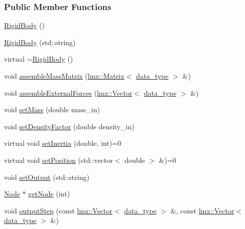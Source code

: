 \subsubsection*{Public Member Functions}
\begin{DoxyCompactItemize}
\item 
\hyperlink{classmknix_1_1_rigid_body_a4e30b93577cba2bdf87201621a5b637c}{Rigid\+Body} ()
\item 
\hyperlink{classmknix_1_1_rigid_body_a2b343858ebee91bb44df59d7a19a5f10}{Rigid\+Body} (std\+::string)
\item 
virtual \hyperlink{classmknix_1_1_rigid_body_a61c219dee02f49659bc34528c2d0af49}{$\sim$\+Rigid\+Body} ()
\item 
void \hyperlink{classmknix_1_1_rigid_body_ac20200b40e6e222261bb8257e339d7b4}{assemble\+Mass\+Matrix} (\hyperlink{classlmx_1_1_matrix}{lmx\+::\+Matrix}$<$ \hyperlink{namespacemknix_a16be4b246fbf2cceb141e3a179111020}{data\+\_\+type} $>$ \&)
\item 
void \hyperlink{classmknix_1_1_rigid_body_a18c7ffa5b9f2d3df008a92f421404fac}{assemble\+External\+Forces} (\hyperlink{classlmx_1_1_vector}{lmx\+::\+Vector}$<$ \hyperlink{namespacemknix_a16be4b246fbf2cceb141e3a179111020}{data\+\_\+type} $>$ \&)
\item 
void \hyperlink{classmknix_1_1_rigid_body_a414c67125617203f207508c35c38180e}{set\+Mass} (double mass\+\_\+in)
\item 
void \hyperlink{classmknix_1_1_rigid_body_a78b6a80378f305c135f112c7f4ed05a5}{set\+Density\+Factor} (double density\+\_\+in)
\item 
virtual void \hyperlink{classmknix_1_1_rigid_body_a3c41ec0b893b6376614dd5d560d6f011}{set\+Inertia} (double, int)=0
\item 
virtual void \hyperlink{classmknix_1_1_rigid_body_a43249b2d83145ec87c8204da2f6a048c}{set\+Position} (std\+::vector$<$ double $>$ \&)=0
\item 
void \hyperlink{classmknix_1_1_rigid_body_a7d3b331008d65caf46f5575fec6943b5}{set\+Output} (std\+::string)
\item 
\hyperlink{classmknix_1_1_node}{Node} $\ast$ \hyperlink{classmknix_1_1_rigid_body_ad0295b9c8e71166c1ec6b1c0ab0335be}{get\+Node} (int)
\item 
void \hyperlink{classmknix_1_1_rigid_body_a721e9f81cfba9a3d425df36f7cf5ef71}{output\+Step} (const \hyperlink{classlmx_1_1_vector}{lmx\+::\+Vector}$<$ \hyperlink{namespacemknix_a16be4b246fbf2cceb141e3a179111020}{data\+\_\+type} $>$ \&, const \hyperlink{classlmx_1_1_vector}{lmx\+::\+Vector}$<$ \hyperlink{namespacemknix_a16be4b246fbf2cceb141e3a179111020}{data\+\_\+type} $>$ \&)

\end{DoxyCompactItemize}
